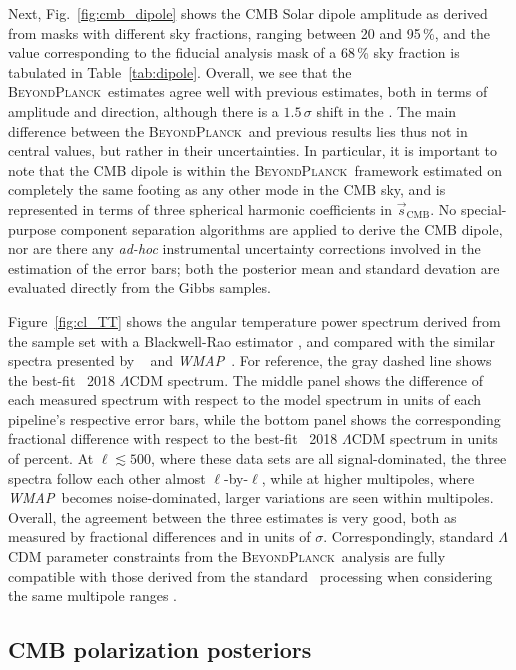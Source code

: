 \documentclass[twocolumn]{aa}
\def\WMAP{\emph{WMAP}}
\newcommand{\s}[0]{\vec{s}}
\newcommand{\BP}{\textsc{BeyondPlanck}}
\begin{document}
Next, Fig.~\ref{fig:cmb_dipole} shows the CMB Solar dipole amplitude
as derived from masks with different sky fractions, ranging between 20
and 95\,\%, and the value corresponding to the fiducial analysis mask
of a 68\,\% sky fraction is tabulated in
Table~\ref{tab:dipole}. Overall, we see that the \BP\ estimates agree
well with previous estimates, both in terms of amplitude and
direction, although there is a $1.5\,\sigma$ shift in the . The main difference between the \BP\ and previous results
lies thus not in central values, but rather in their uncertainties. In
particular, it is important to note that the CMB dipole is within the
\BP\ framework estimated on completely the same footing as any other
mode in the CMB sky, and is represented in terms of three spherical
harmonic coefficients in $\s_{\mathrm{CMB}}$. No special-purpose
component separation algorithms are applied to derive the CMB dipole,
nor are there any \emph{ad-hoc} instrumental uncertainty corrections
involved in the estimation of the error bars; both the posterior mean
and standard devation are evaluated directly from the Gibbs
samples. 

Figure~\ref{fig:cl_TT} shows the angular temperature power spectrum
derived from the sample set with a Blackwell-Rao estimator
\citep{chu2005,bp11}, and compared with the similar spectra presented
by \Planck\ \citep{planck2016-l05} and \WMAP\ \citep{hinshaw2012}. For
reference, the gray dashed line shows the best-fit \Planck\ 2018
$\Lambda$CDM spectrum. The middle panel shows the difference of each
measured spectrum with respect to the model spectrum in units of each
pipeline's respective error bars, while the bottom panel shows the
corresponding fractional difference with respect to the best-fit
\Planck\ 2018 $\Lambda$CDM spectrum in units of percent. At
$\ell\lesssim 500$, where these data sets are all signal-dominated,
the three spectra follow each other almost $\ell$-by-$\ell$, while at
higher multipoles, where \WMAP\ becomes noise-dominated, larger
variations are seen within multipoles. Overall, the agreement between
the three estimates is very good, both as measured by fractional
differences and in units of $\sigma$. Correspondingly, standard
$\Lambda$CDM parameter constraints from the \BP\ analysis are fully
compatible with those derived from the standard \Planck\ processing
when considering the same multipole ranges \citep{bp12}. 


\subsection{CMB polarization posteriors}
\end{document}
